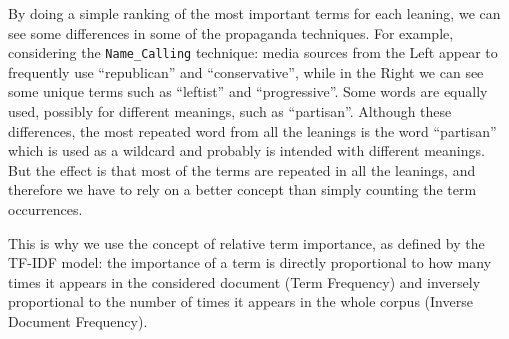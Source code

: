 
By doing a simple ranking of the most important terms for each leaning, we can see some differences in some of the propaganda techniques. For example, considering the \texttt{Name\_Calling} technique:
media sources from the Left appear to frequently use ``republican'' and ``conservative'', while in the Right we can see some unique terms such as ``leftist'' and ``progressive''. Some words are equally used, possibly for different meanings, such as ``partisan''.  
Although these differences, the most repeated word from all the leanings is the word ``partisan'' which is used as a wildcard and probably is intended with different meanings.
But the effect is that most of the terms are repeated in all the leanings, and therefore we have to rely on a better concept than simply counting the term occurrences.

This is why we use the concept of relative term importance, %
as defined by the TF-IDF model: the importance of a term is directly proportional to how many times it appears in the considered document (Term Frequency) and inversely proportional to the number of times it appears in the whole corpus (Inverse Document Frequency).

